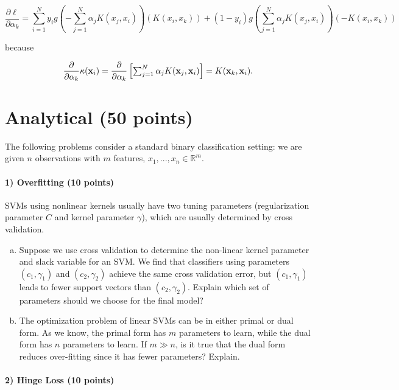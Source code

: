 \documentclass[11pt]{article}
\newcommand{\vx}{{\bf x}}
\newcommand{\pder}[2][]{\frac{\partial#1}{\partial#2}}
\begin{document}
\begin{equation}
\pder[\ell]{\alpha_k} = \sum_{i=1}^{N} y_i g\left(-\textstyle \sum_{j=1}^{N} \alpha_j K(x_j, x_i)\right) \left(K(x_i, x_k)\right) 
+ (1 - y_i) g\left(\textstyle \sum_{j=1}^{N} \alpha_j K(x_j, x_i)\right) \left(-K(x_i, x_k)\right) 
\end{equation}

\noindent because

\begin{equation}
\pder{\alpha_k}\kappa(\vx_i)  = \pder{\alpha_k}\left[ \textstyle\sum_{j=1}^N \alpha_j K(\vx_j, \vx_i) \right] = K(\vx_k, \vx_i).
\end{equation}



\section{Analytical (50 points)}

The following problems consider a standard binary classification setting: we are given $n$ observations with $m$ features, $x_1,...,x_n \in \mathbb{R}^m$.

\paragraph{1) Overfitting (10 points)}
SVMs using nonlinear kernels usually have two tuning parameters (regularization parameter $C$ and kernel parameter $\gamma$), which are usually determined by cross validation. 
\begin{enumerate}[(a)]
\item Suppose we use cross validation to determine the non-linear kernel parameter and slack variable for an SVM. We find that classifiers using parameters $(c_1,\gamma_1)$ and $(c_2,\gamma_2)$ achieve the same cross validation error, but $(c_1,\gamma_1)$ leads to fewer support vectors than $(c_2,\gamma_2)$. Explain which set of parameters should we choose for the final model?
\item The optimization problem of linear SVMs can be in either primal or dual form. As we know, the primal form has $m$ parameters to learn, while the dual form has $n$ parameters to learn. If $m \gg n$, is it true that the dual form reduces over-fitting since it has fewer parameters? Explain.
\end{enumerate}

\paragraph{2) Hinge Loss (10 points)}
\end{document}
